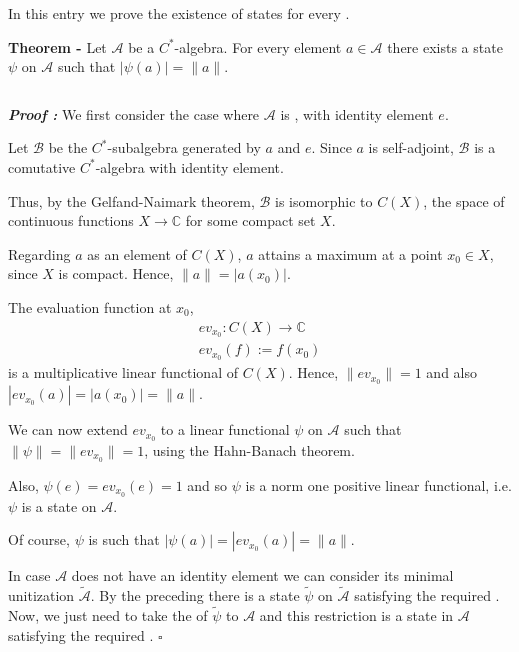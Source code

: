 \documentclass[12pt]{article}
\begin{document}

In this entry we prove the existence of states for every .

{\bf Theorem -} Let $\mathcal{A}$ be a $C^*$-algebra. For every  element $a \in \mathcal{A}$ there exists a state $\psi$ on $\mathcal{A}$ such that $|\psi(a)|=\|a\|$.

$\;$

{\bf \emph{Proof :}} We first consider the case where $\mathcal{A}$ is , with identity element $e$.

Let $\mathcal{B}$ be the $C^*$-subalgebra generated by $a$ and $e$. Since $a$ is self-adjoint, $\mathcal{B}$ is a comutative $C^*$-algebra with identity element.

Thus, by the Gelfand-Naimark theorem, $\mathcal{B}$ is isomorphic to $C(X)$, the space of continuous functions $X \longrightarrow \mathbb{C}$ for some compact set $X$.

Regarding $a$ as an element of $C(X)$, $a$ attains a maximum at a point $x_0 \in X$, since $X$ is compact. Hence, $\|a\| = |a(x_0)|$.

The evaluation function at $x_0$,
\begin{align*}
ev_{x_0}: C(X) \longrightarrow \mathbb{C}\\
ev_{x_0}(f):= f(x_0)
\end{align*}
is a multiplicative linear functional of $C(X)$. Hence, $\|ev_{x_0}\|=1$ and also $|ev_{x_0}(a)|= |a(x_0)|=\|a\|$.

We can now extend $ev_{x_0}$ to a linear functional $\psi$ on $\mathcal{A}$ such that $\|\psi\| = \|ev_{x_0}\|=1$, using the Hahn-Banach theorem.

Also, $\psi(e) = ev_{x_0}(e)=1$ and so $\psi$ is a norm one positive linear functional, i.e. $\psi$ is a state on $\mathcal{A}$.

Of course, $\psi$ is such that $|\psi(a)| = |ev_{x_0}(a)| = \|a\|$.

In case $\mathcal{A}$ does not have an identity element we can consider its minimal unitization $\widetilde{\mathcal{A}}$. By the preceding  there is a state $\widetilde{\psi}$ on $\widetilde{\mathcal{A}}$ satisfying the required . Now, we just need to take the  of $\widetilde{\psi}$ to $\mathcal{A}$ and this restriction is a state in $\mathcal{A}$ satisfying the required . $\square$
\end{document}
